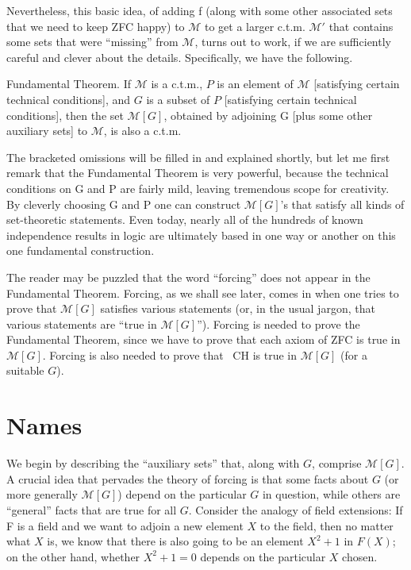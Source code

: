 \documentclass[10pt]{article}
\newcommand\axiom[1]{\textmd{#1}}
\theoremstyle{definition}
\begin{document}
Nevertheless, this basic idea, of adding f (along with some other associated sets that we need to keep \axiom{ZFC} happy) to $\mathcal{M}$ to get a larger c.t.m. $\mathcal{M'}$ that contains some sets that were ``missing'' from $\mathcal M$, turns out to work, if we are sufficiently careful and clever about the details. Specifically, we have the following.

Fundamental Theorem. If $\mathcal{M}$ is a c.t.m., $P$ is an element of $\mathcal{M}$ [satisfying certain technical conditions], and $G$ is a subset of $P$ [satisfying certain technical conditions], then the set $\mathcal{M}[G]$, obtained by adjoining G [plus some other auxiliary sets] to $\mathcal M$, is also a c.t.m.

The bracketed omissions will be filled in and explained shortly, but let me first remark that the Fundamental Theorem is very powerful, because the technical conditions on G and P are fairly mild, leaving tremendous scope for creativity. By cleverly choosing G and P one can construct $\mathcal{M}[G]$'s that satisfy all kinds of set-theoretic statements. Even today, nearly all of the hundreds of known independence results in logic are ultimately based in one way or another on this one fundamental construction.

The reader may be puzzled that the word ``forcing'' does not appear in the Fundamental Theorem. Forcing, as we shall see later, comes in when one tries to prove that $\mathcal{M}[G]$ satisfies various statements (or, in the usual jargon, that various statements are ``true in $\mathcal{M}[G]$''). Forcing is needed to prove the Fundamental Theorem, since we have to prove that each axiom of \axiom{ZFC} is true in $\mathcal{M}[G]$. Forcing is also needed to prove that \axiom{~CH} is true in $\mathcal{M}[G]$ (for a suitable $G$).


\section{Names}

We begin by describing the ``auxiliary sets'' that, along with $G$, comprise $\mathcal M[G]$. A crucial idea that pervades the theory of forcing is that some facts about $G$ (or more generally $\mathcal{M}[G]$) depend on the particular $G$ in question, while others are ``general'' facts that are true for all $G$. Consider the analogy of field extensions: If F is a field and we want to adjoin a new element $X$ to the field, then no matter what $X$ is, we know that there is also going to be an element $X^2 + 1$ in $F(X)$; on the other hand, whether $X^2 + 1 = 0$ depends on the particular $X$ chosen.
\end{document}
